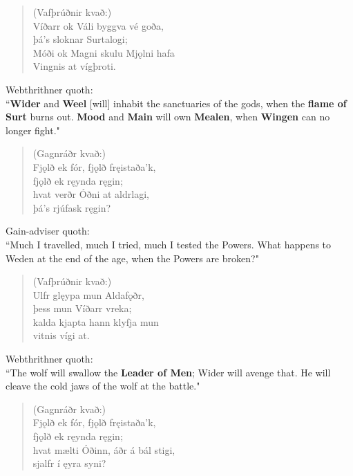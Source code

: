 \begin{verse}
(Vafþrúðnir kvað:) \\%
\bva Víðarr ok Váli \hld byggva vé goða, \\%
\ind þá's sloknar Surtalogi; \\%
Móði ok Magni \hld skulu Mjǫlni hafa \\%
\ind Vingnis at vígþroti.\\%
\end{verse}

\bvb Webthrithner quoth: \\ “\textbf{Wider} and \textbf{Weel} [will] inhabit the sanctuaries of the gods, when the \textbf{flame of Surt} burns out. \textbf{Mood} and \textbf{Main} will own \textbf{Mealen}, when \textbf{Wingen} can no longer fight\footnotemark[110]." \\

\begin{verse}
(Gagnráðr kvað:) \\%
\bva Fjǫlð ek fór, \hld fjǫlð fręistaða'k, \\%
\ind fjǫlð ek ręynda ręgin; \\%
hvat verðr Óðni \hld at aldrlagi, \\%
\ind þá's rjúfask ręgin?\\%
\end{verse}

\bvb Gain-adviser quoth: \\ “Much I travelled, much I tried, much I tested the Powers. What happens to Weden at the end of the age, when the Powers are broken?" \\

\begin{verse}
(Vafþrúðnir kvað:) \\%
\bva Ulfr glęypa \hld mun Aldafǫðr, \\%
\ind þess mun Víðarr vreka; \\%
kalda kjapta \hld hann klyfja mun \\%
\ind vitnis vígi at.\\%
\end{verse}

\bvb Webthrithner quoth: \\ “The wolf will swallow the \textbf{Leader of Men}; Wider will avenge that. He will cleave the cold jaws of the wolf at the battle." \\

\begin{verse}
(Gagnráðr kvað:) \\%
\bva Fjǫlð ek fór, \hld fjǫlð fręistaða'k, \\%
\ind fjǫlð ek ręynda ręgin; \\%
hvat mælti Óðinn, \hld áðr á bál stigi, \\%
\ind sjalfr í ęyra syni?\\%
\end{verse}

